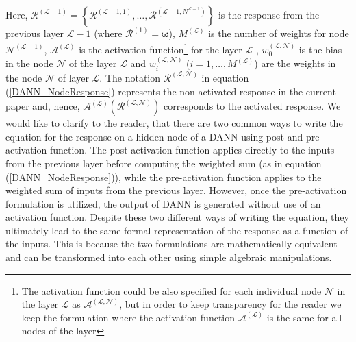 \documentclass[a4paper,fleqn]{article}
\newcommand{\rw}[1]{\textcolor{blue}{#1}}
\newcommand{\del}[1]{\textcolor{red}{\sout{#1}}}
\renewcommand{\del}[1]{}
\renewcommand{\rw}[1]{#1}
\begin{document}
Here, \rw{$\bm{\mathcal{R}}^{(\mathcal{L}-1)}=\left\{\mathcal{R}^{(\mathcal{L}-1,1)},\ldots,\mathcal{R}^{(\mathcal{L}-1,N^{\mathcal{L}-1})}\right\}$} is the response from the previous layer $\mathcal{L}-1$ (where $\bm{\mathcal{R}}^{(1)} =\bm{\omega}$), $M^{(\mathcal{L})}$ is the number of weights for node $\mathcal{N}^{(\mathcal{L}-1)}$, $\mathcal{A}^{(\mathcal{L})}$ is \del{an} \rw{the} activation function\footnote{The activation function could be also specified for each individual node $\mathcal{N}$ in the layer $\mathcal{L}$ as $\mathcal{A}^{(\mathcal{L},\mathcal{N})}$, but in order to keep transparency for the reader we keep the formulation where the activation function $\mathcal{A}^{(\mathcal{L})}$ is the same for all nodes of the layer} for the layer $\mathcal{L}$ , $w^{(\mathcal{L},\mathcal{N})}_{0}$ is \del{a} \rw{the} bias in the node $\mathcal{N}$ of the layer $\mathcal{L}$ and $w^{(\mathcal{L},\mathcal{N})}_{i}$ ($i=1,\ldots,M^{(\mathcal{L})}$) are the weights in the node $\mathcal{N}$ of layer $\mathcal{L}$. \rw{The notation $\mathcal{R}^{(\mathcal{L},\mathcal{N})}$ in equation (\ref{DANN_NodeResponse}) represents the non-activated response in the current paper \del{(e.g. as the overall DANN response constructed on the last layer)} and, hence, $\mathcal{A}^{(\mathcal{L})}(\mathcal{R}^{(\mathcal{L},\mathcal{N})})$ corresponds to the activated response.} \rw{We would like to clarify to the reader, that there are two common ways \cite{anthony2009neural} to write the equation for the response on a hidden node of a DANN using post and pre-activation function. The post-activation function applies directly to the inputs from the previous layer before computing the weighted sum (as in equation (\ref{DANN_NodeResponse})), while the pre-activation function applies to the weighted sum of inputs from the previous layer. However, once the pre-activation formulation is utilized, the output of DANN is generated without use of an activation function. Despite these two different ways of writing the equation, they ultimately lead to the same formal representation of the response as a function of the inputs. This is because the two formulations are mathematically equivalent and can be transformed into each other using simple algebraic manipulations.}
\end{document}
